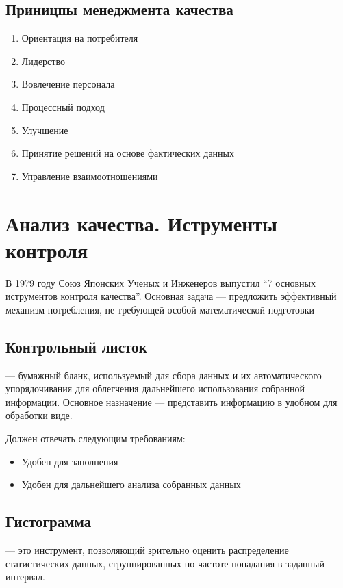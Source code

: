 \documentclass[a4paper, 14pt]{extarticle}
\begin{document}
\subsection{Приницпы менеджмента качества}
\begin{enumerate}[label={\textbf{Принцип \arabic*.}}, align=left]
    \item Ориентация на потребителя
    \item Лидерство
    \item Вовлечение персонала
    \item Процессный подход
    \item Улучшение
    \item Принятие решений на основе фактических данных
    \item Управление взаимоотношениями
\end{enumerate}

\section{Анализ качества. Иструменты контроля}
В 1979 году Союз Японских Ученых и Инженеров выпустил ``7 основных иструментов контроля качества''. Основная задача --- предложить эффективный механизм потребления, не требующей особой математической подготовки

\subsection{Контрольный листок}
 --- бумажный бланк, используемый для сбора данных и их автоматического упорядочивания для облегчения дальнейшего использования собранной информации. Основное назначение --- представить информацию в удобном для обработки виде.

Должен отвечать следующим требованиям:
\begin{itemize}
    \item Удобен для заполнения
    \item Удобен для дальнейшего анализа собранных данных
\end{itemize}

\subsection{Гистограмма}
 --- это инструмент, позволяющий зрительно оценить распределение статистических данных, сгруппированных по частоте попадания в заданный интервал.
\end{document}
